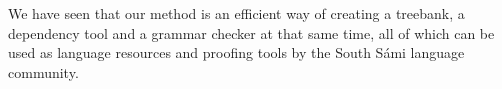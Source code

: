 \documentclass[free]{flammie}
\begin{document}
We have seen that our method is an efficient way of creating a treebank, a
dependency tool and a grammar checker at that same time, all of which can be
used as language resources and proofing tools by the South Sámi language
community.







\appendix
\end{document}
